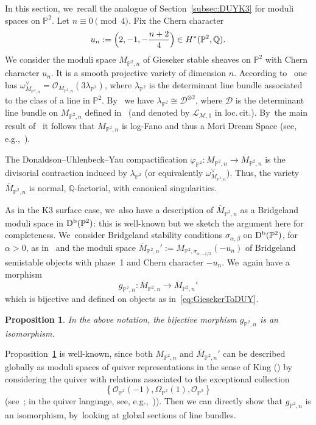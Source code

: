 \documentclass[JEP,XML,SOM,Unicode,published]{cedram}
\newcommand{\PP}{{\mathbb P}}\let\P\PP
\newcommand{\QQ}{{\mathbb Q}}\let\Q\QQ
\newcommand\cD{\mathcal{D}}
\newcommand\cL{\mathcal{L}}
\newcommand\cM{\mathcal{M}}
\newcommand\cO{\mathcal{O}}
\DeclareMathOperator{\Db}{D^{\textup b}}
\let\phi\varphi
\newtheorem{prop}[lemm]{Proposition}
\theoremstyle{definition}
\begin{document}
\label{subsec:DUYP2}

In this section, we~recall the analogue of Section~\ref{subsec:DUYK3} for moduli spaces on $\PP^2$.
Let $n\equiv 0 \pmod 4$.
Fix the Chern character
\[
u_n:=\Bigl(2, -1, -\frac{n+2}{4} \Bigr)\in H^*(\PP^2,\QQ).
\]
We consider the moduli space $M_{\PP^2,n}$ of Gieseker stable sheaves on $\PP^2$ with Chern character $u_n$.
It is a smooth projective variety of dimension $n$. According to~\cite[Th.\,8.3.3]{HL:moduli} one has $\omega_{M_{\PP^2,n}}^\vee = \cO_{M_{\PP^2,n}}(3\lambda_{\PP^2})$, where $\lambda_{\PP^2}$ is the determinant line bundle associated to the class of a line in $\PP^2$. By~\cite[Lem.\,8.3.4]{HL:moduli} we have $\lambda_{\PP^2}\cong \cD^{\otimes 2}$, where $\cD$ is the determinant line bundle on $M_{\PP^2,n}$ defined in~\cite{Li:uhlencomp} (and denoted by $\cL_{\cM,1}$ in loc.\,cit.). By~the main result of~\cite{Li:uhlencomp} it follows that $M_{\PP^2,n}$ is log-Fano and thus a Mori Dream Space (see, e.g.,~\cite[Ex.\,3.2]{Castravet:MDS}).

The Donaldson--Uhlenbeck--Yau compactification $\phi_{\PP^2}\colon M_{\PP^2,n}\to \overline{M}_{\PP^2,n}$ is the divisorial contraction induced by $\lambda_{\PP^2}$ (or equivalently $\omega_{M_{\PP^2,n}}^\vee$).
Thus, the variety $\overline{M}_{\PP^2,n}$ is normal, $\QQ$-factorial, with canonical singularities.

As in the K3 surface case, we~also have a description of $\overline{M}_{\PP^2,n}$ as a Bridgeland moduli space in $\Db(\PP^2)$: this is well-known but we sketch the argument here for completeness. We~consider Bridgeland stability conditions $\sigma_{\alpha,\beta}$ on $\Db(\PP^2)$, for $\alpha>0$, as in~\cite[Th.\,6.10]{MS:lectures} and the moduli space $\overline{M}_{\PP^2,n}':=M_{\PP^2,\sigma_{\alpha,-1/2}}(-u_n)$ of Bridgeland semistable objects with phase~1 and Chern character $-u_n$. We~again have a morphism
\[
g_{\PP^2,n}\colon \overline{M}_{\PP^2,n} \to \overline{M}_{\PP^2,n}'
\]
which is bijective and defined on objects as in~\eqref{eq:GiesekerToDUY}.

\begin{prop}\label{prop:UhlenbeckVsBridgelandP2}
In the above notation, the bijective morphism $g_{\PP^2,n}$ is an isomorphism.
\end{prop}

Proposition~\ref{prop:UhlenbeckVsBridgelandP2} is well-known, since both $M_{\PP^2,n}$ and $\overline{M}_{\PP^2,n}'$ can be described globally as moduli spaces of quiver representations in the sense of King (\cite{King:Moduli}) by considering the quiver with relations associated to the exceptional collection
\[
\left\{\cO_{\PP^2}(-1), \Omega_{\PP^2}(1), \cO_{\PP^2} \right\}
\]
(see~\cite{DLP}; in the quiver language, see, e.g.,~\cite[Main\,Th.\,1.3]{Okhawa:P2})).
Then we can directly show that $g_{\PP^2,n}$ is an isomorphism, by~looking at global sections of line bundles.
\end{document}
